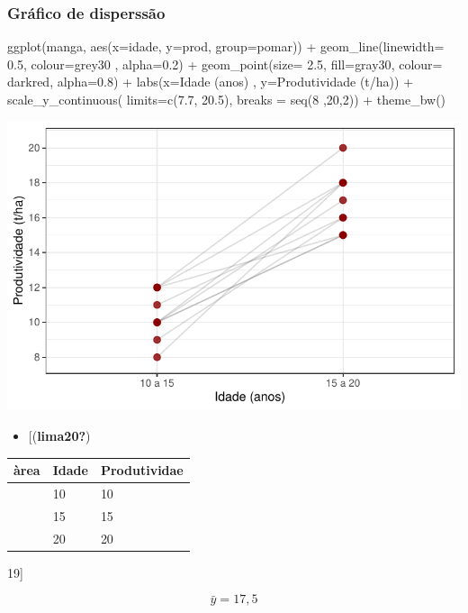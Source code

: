 \documentclass[
  letterpaper,
  DIV=11,
  numbers=noendperiod]{scrartcl}
\newenvironment{Shaded}{\begin{snugshade}}{\end{snugshade}}
\newcommand{\AttributeTok}[1]{\textcolor[rgb]{0.40,0.45,0.13}{#1}}
\newcommand{\DecValTok}[1]{\textcolor[rgb]{0.68,0.00,0.00}{#1}}
\newcommand{\FloatTok}[1]{\textcolor[rgb]{0.68,0.00,0.00}{#1}}
\newcommand{\FunctionTok}[1]{\textcolor[rgb]{0.28,0.35,0.67}{#1}}
\newcommand{\NormalTok}[1]{\textcolor[rgb]{0.00,0.23,0.31}{#1}}
\newcommand{\SpecialCharTok}[1]{\textcolor[rgb]{0.37,0.37,0.37}{#1}}
\newcommand{\StringTok}[1]{\textcolor[rgb]{0.13,0.47,0.30}{#1}}
\providecommand{\tightlist}{%
  \setlength{\itemsep}{0pt}\setlength{\parskip}{0pt}}\usepackage{longtable,booktabs,array}
\begin{document}
\subsubsection{Gráfico de disperssão}\label{gruxe1fico-de-disperssuxe3o}

\begin{Shaded}
\begin{Highlighting}[]
\FunctionTok{ggplot}\NormalTok{(manga, }\FunctionTok{aes}\NormalTok{(}\AttributeTok{x=}\NormalTok{idade, }\AttributeTok{y=}\NormalTok{prod, }\AttributeTok{group=}\NormalTok{pomar)) }\SpecialCharTok{+}
 \FunctionTok{geom\_line}\NormalTok{(}\AttributeTok{linewidth=} \FloatTok{0.5}\NormalTok{, }\AttributeTok{colour=}\StringTok{\textquotesingle{}grey30\textquotesingle{}}\NormalTok{ , }\AttributeTok{alpha=}\FloatTok{0.2}\NormalTok{) }\SpecialCharTok{+}
 \FunctionTok{geom\_point}\NormalTok{(}\AttributeTok{size=} \FloatTok{2.5}\NormalTok{, }\AttributeTok{fill=}\StringTok{\textquotesingle{}gray30\textquotesingle{}}\NormalTok{, }\AttributeTok{colour=} \StringTok{\textquotesingle{}darkred\textquotesingle{}}\NormalTok{, }\AttributeTok{alpha=}\FloatTok{0.8}\NormalTok{) }\SpecialCharTok{+}
 \FunctionTok{labs}\NormalTok{(}\AttributeTok{x=}\StringTok{\textquotesingle{}Idade (anos)\textquotesingle{}}\NormalTok{ , }\AttributeTok{y=}\StringTok{\textquotesingle{}Produtividade (t/ha)\textquotesingle{}}\NormalTok{) }\SpecialCharTok{+}
 \FunctionTok{scale\_y\_continuous}\NormalTok{( }\AttributeTok{limits=}\FunctionTok{c}\NormalTok{(}\FloatTok{7.7}\NormalTok{, }\FloatTok{20.5}\NormalTok{), }\AttributeTok{breaks =} \FunctionTok{seq}\NormalTok{(}\DecValTok{8}\NormalTok{ ,}\DecValTok{20}\NormalTok{,}\DecValTok{2}\NormalTok{)) }\SpecialCharTok{+}
 \FunctionTok{theme\_bw}\NormalTok{()}
\end{Highlighting}
\end{Shaded}

\includegraphics{dia2_files/figure-pdf/unnamed-chunk-3-1.pdf}

\begin{itemize}
\tightlist
\item
  {[}(\textbf{lima20?})
\end{itemize}

\begin{longtable}[]{@{}lll@{}}
\toprule\noalign{}
àrea & Idade & Produtividae \\
\midrule\noalign{}
\endhead
\bottomrule\noalign{}
\endlastfoot
& 10 & 10 \\
& 15 & 15 \\
& 20 & 20 \\
\end{longtable}

19{]}

\[
\bar{y}= 17,5
\]
\end{document}
